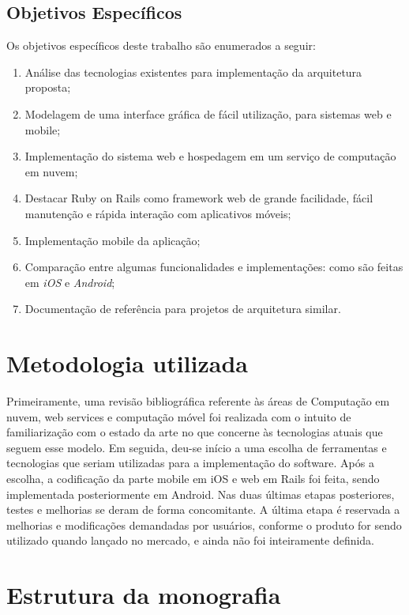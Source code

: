 \subsection{Objetivos Específicos}
 
Os objetivos específicos deste trabalho são enumerados a seguir:
\begin{enumerate}
\item Análise das tecnologias existentes para implementação da arquitetura proposta;
\item Modelagem de uma interface gráfica de fácil utilização, para sistemas web e mobile;
\item Implementação do sistema web e hospedagem em um serviço de computação em nuvem;
\item Destacar Ruby on Rails como framework web de grande facilidade, fácil manutenção e rápida interação com aplicativos móveis;
\item Implementação mobile da aplicação;
\item Comparação entre algumas funcionalidades e implementações: como  são feitas  em \emph{iOS} e \emph{Android};
\item Documentação de referência para projetos de arquitetura similar.
 \end{enumerate}
\section{Metodologia utilizada}
 
        Primeiramente, uma revisão bibliográfica referente às áreas de Computação em nuvem, web services e computação móvel foi realizada com o intuito de familiarização com o estado da arte no que concerne às tecnologias atuais que seguem esse modelo. Em seguida, deu-se início a uma escolha de ferramentas e tecnologias que seriam utilizadas para a implementação do software.  Após a escolha, a codificação da parte mobile em iOS e web em Rails  foi feita, sendo implementada posteriormente em Android. Nas duas últimas etapas posteriores, testes e melhorias se deram de forma concomitante.  A última etapa é reservada a melhorias e modificações demandadas por usuários, conforme o produto for sendo utilizado quando lançado no mercado, e ainda não foi inteiramente definida.
 
\section{Estrutura da monografia }
 
